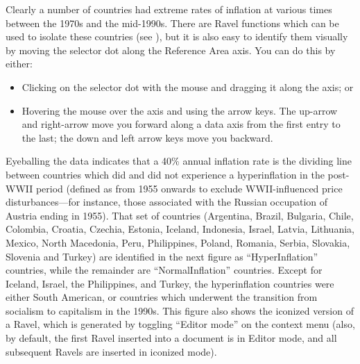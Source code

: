 Clearly a number of countries had extreme rates of inflation at various
times between the 1970s and the mid-1990s. There are Ravel functions
which can be used to isolate these countries (see ),
but it is also easy to identify them visually by moving the selector
dot along the Reference Area axis. You can do this by either:
\begin{itemize}
\item Clicking on the selector dot with the mouse and dragging it along
the axis; or
\item Hovering the mouse over the axis and using the arrow keys. The up-arrow
and right-arrow move you forward along a data axis from the first
entry to the last; the down and left arrow keys move you backward.
\end{itemize}
Eyeballing the data indicates that a 40\% annual inflation rate is
the dividing line between countries which did and did not experience
a hyperinflation in the post-WWII period (defined as from 1955 onwards
to exclude WWII-influenced price disturbances---for instance, those
associated with the Russian occupation of Austria ending in 1955).
That set of countries (Argentina, Brazil, Bulgaria, Chile, Colombia,
Croatia, Czechia, Estonia, Iceland, Indonesia, Israel, Latvia, Lithuania,
Mexico, North Macedonia, Peru, Philippines, Poland, Romania, Serbia,
Slovakia, Slovenia and Turkey) are identified in the next figure as
``HyperInflation'' countries, while the remainder are ``NormalInflation''
countries. Except for Iceland, Israel, the Philippines, and Turkey,
the hyperinflation countries were either South American, or countries
which underwent the transition from socialism to capitalism in the
1990s. This figure also shows the iconized version of a Ravel, which
is generated by toggling ``Editor mode'' on the context menu (also,
by default, the first Ravel inserted into a document is in Editor
mode, and all subsequent Ravels are inserted in iconized mode).

